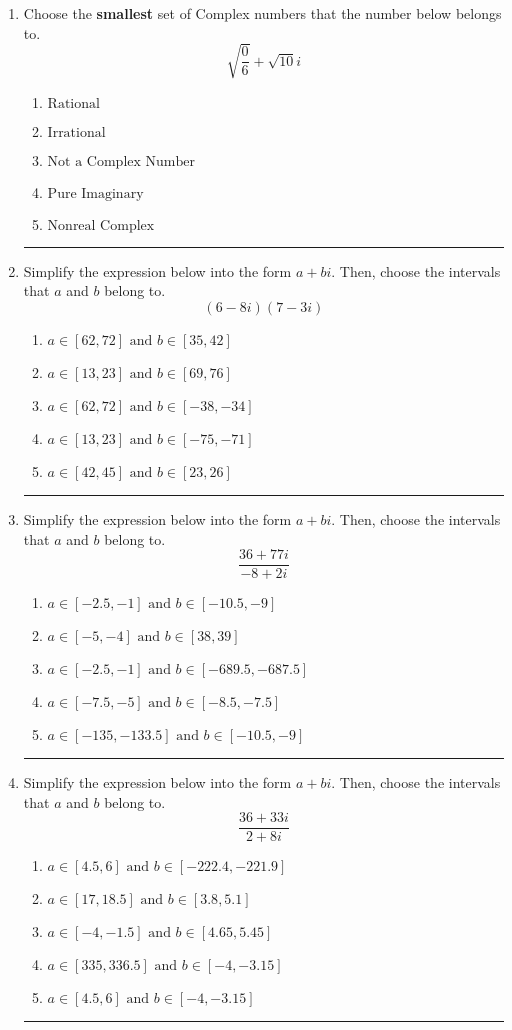\documentclass[14pt]{extbook}
\newcommand{\litem}[1]{\item#1\hspace*{-1cm}\rule{\textwidth}{0.4pt}}
\begin{document}
\begin{enumerate}
\litem{
Choose the \textbf{smallest} set of Complex numbers that the number below belongs to.\[ \sqrt{\frac{0}{6}}+\sqrt{10}i \]\begin{enumerate}[label=\Alph*.]
\item \( \text{Rational} \)
\item \( \text{Irrational} \)
\item \( \text{Not a Complex Number} \)
\item \( \text{Pure Imaginary} \)
\item \( \text{Nonreal Complex} \)

\end{enumerate} }
\litem{
Simplify the expression below into the form $a+bi$. Then, choose the intervals that $a$ and $b$ belong to.\[ (6 - 8 i)(7 - 3 i) \]\begin{enumerate}[label=\Alph*.]
\item \( a \in [62, 72] \text{ and } b \in [35, 42] \)
\item \( a \in [13, 23] \text{ and } b \in [69, 76] \)
\item \( a \in [62, 72] \text{ and } b \in [-38, -34] \)
\item \( a \in [13, 23] \text{ and } b \in [-75, -71] \)
\item \( a \in [42, 45] \text{ and } b \in [23, 26] \)

\end{enumerate} }
\litem{
Simplify the expression below into the form $a+bi$. Then, choose the intervals that $a$ and $b$ belong to.\[ \frac{36 + 77 i}{-8 + 2 i} \]\begin{enumerate}[label=\Alph*.]
\item \( a \in [-2.5, -1] \text{ and } b \in [-10.5, -9] \)
\item \( a \in [-5, -4] \text{ and } b \in [38, 39] \)
\item \( a \in [-2.5, -1] \text{ and } b \in [-689.5, -687.5] \)
\item \( a \in [-7.5, -5] \text{ and } b \in [-8.5, -7.5] \)
\item \( a \in [-135, -133.5] \text{ and } b \in [-10.5, -9] \)

\end{enumerate} }
\litem{
Simplify the expression below into the form $a+bi$. Then, choose the intervals that $a$ and $b$ belong to.\[ \frac{36 + 33 i}{2 + 8 i} \]\begin{enumerate}[label=\Alph*.]
\item \( a \in [4.5, 6] \text{ and } b \in [-222.4, -221.9] \)
\item \( a \in [17, 18.5] \text{ and } b \in [3.8, 5.1] \)
\item \( a \in [-4, -1.5] \text{ and } b \in [4.65, 5.45] \)
\item \( a \in [335, 336.5] \text{ and } b \in [-4, -3.15] \)
\item \( a \in [4.5, 6] \text{ and } b \in [-4, -3.15] \)


\end{enumerate}}
\end{enumerate}
\end{document}
